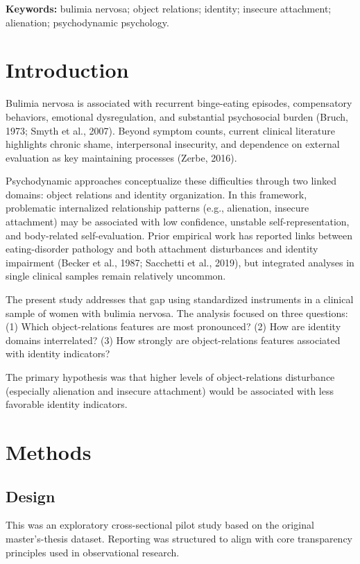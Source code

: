 \documentclass[12pt]{article}
\begin{document}
\noindent\textbf{Keywords:} bulimia nervosa; object relations; identity; insecure attachment; alienation; psychodynamic psychology.

\section{Introduction}
Bulimia nervosa is associated with recurrent binge-eating episodes, compensatory behaviors, emotional dysregulation, and substantial psychosocial burden (Bruch, 1973; Smyth et al., 2007). Beyond symptom counts, current clinical literature highlights chronic shame, interpersonal insecurity, and dependence on external evaluation as key maintaining processes (Zerbe, 2016).

Psychodynamic approaches conceptualize these difficulties through two linked domains: object relations and identity organization. In this framework, problematic internalized relationship patterns (e.g., alienation, insecure attachment) may be associated with low confidence, unstable self-representation, and body-related self-evaluation. Prior empirical work has reported links between eating-disorder pathology and both attachment disturbances and identity impairment (Becker et al., 1987; Sacchetti et al., 2019), but integrated analyses in single clinical samples remain relatively uncommon.

The present study addresses that gap using standardized instruments in a clinical sample of women with bulimia nervosa. The analysis focused on three questions: (1) Which object-relations features are most pronounced? (2) How are identity domains interrelated? (3) How strongly are object-relations features associated with identity indicators?

The primary hypothesis was that higher levels of object-relations disturbance (especially alienation and insecure attachment) would be associated with less favorable identity indicators.

\section{Methods}

\subsection{Design}
This was an exploratory cross-sectional pilot study based on the original master's-thesis dataset. Reporting was structured to align with core transparency principles used in observational research.
\end{document}
